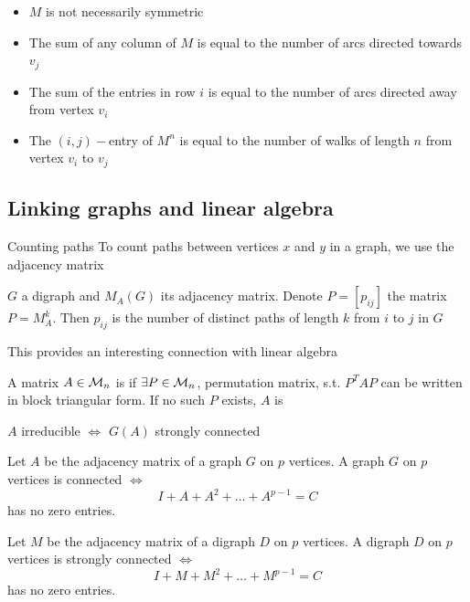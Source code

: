 \documentclass[aspectratio=43]{beamer}
\begin{document}
\begin{frame}
	\begin{property}
		\begin{itemize}
		\item $M$ is not necessarily symmetric
		\item The sum of any column of $M$ is equal to the number of arcs directed towards $v_j$
		\item The sum of the entries in row $i$ is equal to the number of arcs directed away from vertex $v_i$
		\item The $(i,j)-$entry of $M^n$ is equal to the number of walks of length $n$ from vertex $v_i$ to $v_j$
		\end{itemize}
	\end{property}
\end{frame}



\subsection{Linking graphs and linear algebra}

\begin{frame}{Counting paths}
	To count paths between vertices $x$ and $y$ in a graph, we use the adjacency matrix
	\vfill
	\begin{theorem}
		$G$ a digraph and $M_A(G)$ its adjacency matrix. Denote $P=[p_{ij}]$ the matrix $P=M_A^k$. Then $p_{ij}$ is the number of distinct paths of length $k$ from $i$ to $j$ in $G$
	\end{theorem}
	\vfill
	This provides an interesting connection with linear algebra
	\begin{definition}
		A matrix $A\in\mathcal{M}_n$ is  if $\exists P\in\mathcal{M}_n$, permutation matrix, s.t. $P^TAP$ can be written in block triangular form. If no such $P$ exists, $A$ is 
	\end{definition}
	\vfill
	\begin{theorem}
		$A$ irreducible $\iff$ $G(A)$ strongly connected
	\end{theorem}
\end{frame}

\begin{frame}
	\begin{theorem}
		Let $A$ be the adjacency matrix of a graph $G$ on $p$ vertices. 
		A graph $G$ on $p$ vertices is connected $\iff$ $$I+A+A^2+\dots+A^{p-1}=C$$
		has no zero entries.
	\end{theorem}
	\begin{theorem}
		Let $M$ be the adjacency matrix of a digraph $D$ on $p$ vertices. 
		A digraph $D$ on $p$ vertices is strongly connected $\iff$ $$I+M+M^2+\dots+M^{p-1}=C$$
		has no zero entries.
	\end{theorem}
\end{frame}
\end{document}
